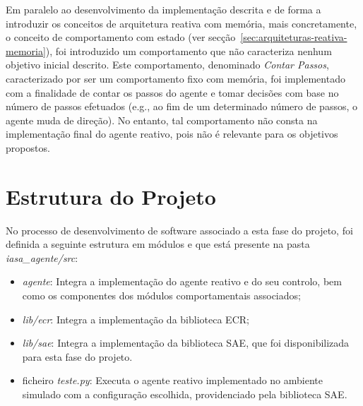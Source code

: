 Em paralelo ao desenvolvimento da implementação descrita e de forma a introduzir os conceitos de arquitetura reativa com memória, mais concretamente, o conceito de comportamento com estado (ver secção~\ref{sec:arquiteturas-reativa-memoria}), foi introduzido um comportamento que não caracteriza nenhum objetivo inicial descrito.
Este comportamento, denominado \textit{Contar Passos}, caracterizado por ser um comportamento fixo com memória, foi implementado com a finalidade de contar os passos do agente e tomar decisões com base no número de passos efetuados (e.g., ao fim de um determinado número de passos, o agente muda de direção).
No entanto, tal comportamento não consta na implementação final do agente reativo, pois não é relevante para os objetivos propostos.


\section{Estrutura do Projeto}\label{sec:estrutura-projeto}

No processo de desenvolvimento de software associado a esta fase do projeto, foi definida a seguinte estrutura em módulos e que está presente na pasta \textit{iasa\_agente/src}:

\begin{itemize}
    \item \textit{agente}: Integra a implementação do agente reativo e do seu controlo, bem como os componentes dos módulos comportamentais associados;
    \item \textit{lib/ecr}: Integra a implementação da biblioteca ECR;
    \item \textit{lib/sae}: Integra a implementação da biblioteca SAE, que foi disponibilizada para esta fase do projeto.
    \item ficheiro \textit{teste.py}: Executa o agente reativo implementado no ambiente simulado com a configuração escolhida, providenciado pela biblioteca SAE.
\end{itemize}
